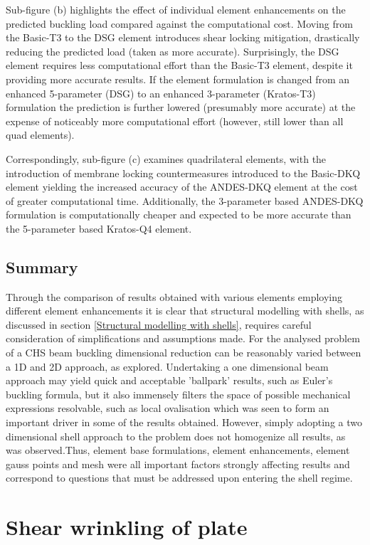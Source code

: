 Sub-figure (b) highlights the effect of individual element enhancements on the predicted buckling load compared against the computational cost. Moving from the Basic-T3 to the DSG element introduces shear locking mitigation, drastically reducing the predicted load (taken as more accurate). Surprisingly, the DSG element requires less computational effort than the Basic-T3 element, despite it providing more accurate results. If the element formulation is changed from an enhanced 5-parameter (DSG) to an enhanced 3-parameter (Kratos-T3) formulation the prediction is further lowered (presumably more accurate) at the expense of noticeably more computational effort (however, still lower than all quad elements).

Correspondingly, sub-figure (c) examines quadrilateral elements, with the introduction of membrane locking countermeasures introduced to the Basic-DKQ element yielding the increased accuracy of the ANDES-DKQ element at the cost of greater computational time. Additionally, the 3-parameter based ANDES-DKQ formulation is computationally cheaper and expected to be more accurate than the 5-parameter based Kratos-Q4 element.

\subsection{Summary}
Through the comparison of results obtained with various elements employing different element enhancements it is clear that structural modelling with shells, as discussed in section \ref{Structural modelling with shells}, requires careful consideration of simplifications and assumptions made. For the analysed problem of a CHS beam buckling dimensional reduction can be reasonably varied between a 1D and 2D approach, as explored. Undertaking a one dimensional beam approach may yield quick and acceptable 'ballpark' results, such as Euler's buckling formula, but it also immensely filters the space of possible mechanical expressions resolvable, such as local ovalisation which was seen to form an important driver in some of the results obtained. However, simply adopting a two dimensional shell approach to the problem does not homogenize all results, as was observed.Thus, element base formulations, element enhancements, element gauss points and mesh were all important factors strongly affecting results and correspond to questions that must be addressed upon entering the shell regime. 

\section{Shear wrinkling of plate}

